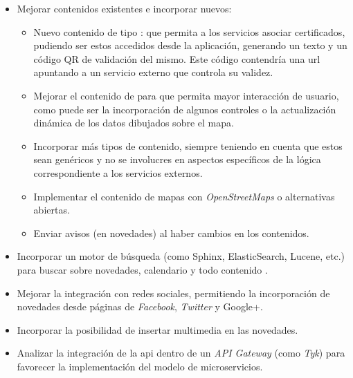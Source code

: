 \begin{itemize}
\item Mejorar contenidos existentes e incorporar nuevos:
\begin{itemize}
\item Nuevo contenido de tipo : que permita a los servicios asociar certificados, pudiendo ser estos accedidos desde la aplicación, generando un texto y un código QR de validación del mismo. Este código contendría una \gls{url} apuntando a un servicio externo que controla su validez. 
\item Mejorar el contenido de  para que permita mayor interacción de usuario, como puede ser la incorporación de algunos controles o la actualización dinámica de los datos dibujados sobre el mapa.
\item Incorporar más tipos de contenido, siempre teniendo en cuenta que estos sean genéricos y no se involucres en aspectos específicos de la lógica correspondiente a los servicios externos.
\item Implementar el contenido de mapas con \textit{OpenStreetMaps} o alternativas abiertas.
\item Enviar avisos (en novedades) al haber cambios en los contenidos.
\end{itemize}
\item Incorporar un motor de búsqueda (como Sphinx, ElasticSearch, Lucene, etc.) para buscar sobre novedades, calendario y todo contenido .
\item Mejorar la integración con redes sociales, permitiendo la incorporación de novedades desde páginas de \textit{Facebook}, \textit{Twitter} y Google+.
\item Incorporar la posibilidad de insertar multimedia en las novedades.
\item Analizar la integración de la \gls{api} dentro de un \textit{API Gateway} (como \textit{Tyk}) para favorecer la implementación del modelo de microservicios.
\end{itemize}